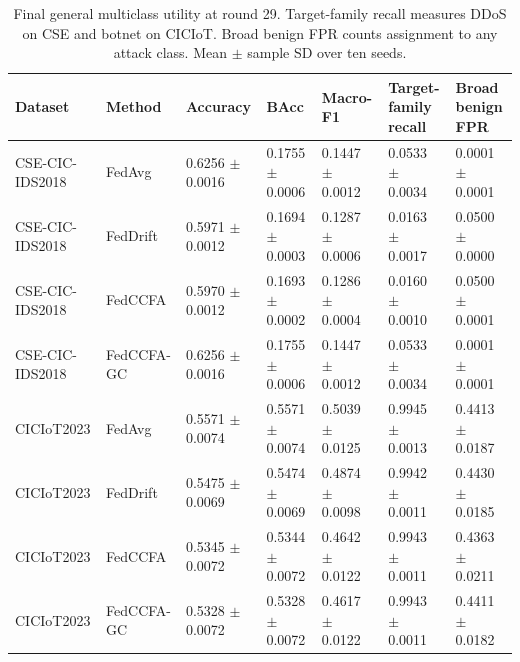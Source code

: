\begin{table}[t]
\centering
\small
\setlength{\tabcolsep}{3pt}
\caption{Final general multiclass utility at round 29. Target-family recall measures DDoS on CSE and botnet on CICIoT. Broad benign FPR counts assignment to any attack class. Mean $\pm$ sample SD over ten seeds.}
\label{tab:final_general_utility}
\begin{tabular}{lllllll}
\hline
Dataset & Method & Accuracy & BAcc & Macro-F1 & \shortstack{Target-family\\recall} & \shortstack{Broad benign\\FPR} \\
\hline
CSE-CIC-IDS2018 & FedAvg & 0.6256 $\pm$ 0.0016 & 0.1755 $\pm$ 0.0006 & 0.1447 $\pm$ 0.0012 & 0.0533 $\pm$ 0.0034 & 0.0001 $\pm$ 0.0001 \\
CSE-CIC-IDS2018 & FedDrift & 0.5971 $\pm$ 0.0012 & 0.1694 $\pm$ 0.0003 & 0.1287 $\pm$ 0.0006 & 0.0163 $\pm$ 0.0017 & 0.0500 $\pm$ 0.0000 \\
CSE-CIC-IDS2018 & FedCCFA & 0.5970 $\pm$ 0.0012 & 0.1693 $\pm$ 0.0002 & 0.1286 $\pm$ 0.0004 & 0.0160 $\pm$ 0.0010 & 0.0500 $\pm$ 0.0001 \\
CSE-CIC-IDS2018 & FedCCFA-GC & 0.6256 $\pm$ 0.0016 & 0.1755 $\pm$ 0.0006 & 0.1447 $\pm$ 0.0012 & 0.0533 $\pm$ 0.0034 & 0.0001 $\pm$ 0.0001 \\
CICIoT2023 & FedAvg & 0.5571 $\pm$ 0.0074 & 0.5571 $\pm$ 0.0074 & 0.5039 $\pm$ 0.0125 & 0.9945 $\pm$ 0.0013 & 0.4413 $\pm$ 0.0187 \\
CICIoT2023 & FedDrift & 0.5475 $\pm$ 0.0069 & 0.5474 $\pm$ 0.0069 & 0.4874 $\pm$ 0.0098 & 0.9942 $\pm$ 0.0011 & 0.4430 $\pm$ 0.0185 \\
CICIoT2023 & FedCCFA & 0.5345 $\pm$ 0.0072 & 0.5344 $\pm$ 0.0072 & 0.4642 $\pm$ 0.0122 & 0.9943 $\pm$ 0.0011 & 0.4363 $\pm$ 0.0211 \\
CICIoT2023 & FedCCFA-GC & 0.5328 $\pm$ 0.0072 & 0.5328 $\pm$ 0.0072 & 0.4617 $\pm$ 0.0122 & 0.9943 $\pm$ 0.0011 & 0.4411 $\pm$ 0.0182 \\
\hline
\end{tabular}
\end{table}
